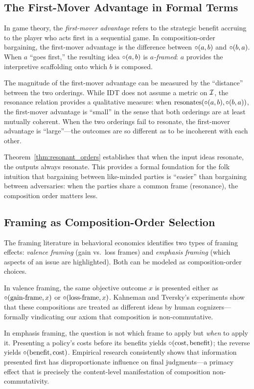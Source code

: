 \subsection{The First-Mover Advantage in Formal Terms}

In game theory, the \emph{first-mover advantage} refers to the strategic
benefit accruing to the player who acts first in a sequential game.  In
composition-order bargaining, the first-mover advantage is the difference
between $\circ(a, b)$ and $\circ(b, a)$.  When $a$ ``goes first,''
the resulting idea $\circ(a, b)$ is \emph{$a$-framed}: $a$ provides the
interpretive scaffolding onto which $b$ is composed.

The magnitude of the first-mover advantage can be measured by the
``distance'' between the two orderings.  While IDT does not assume a metric
on $\mathcal{I}$, the resonance relation provides a qualitative measure: when
$\text{resonates}(\circ(a,b), \circ(b,a))$, the first-mover advantage
is ``small'' in the sense that both orderings are at least mutually
coherent.  When the two orderings fail to resonate, the first-mover
advantage is ``large''---the outcomes are so different as to be
incoherent with each other.

Theorem~\ref{thm:resonant_orders} establishes that when the input ideas
resonate, the outputs always resonate.  This provides a formal foundation
for the folk intuition that bargaining between like-minded parties is
``easier'' than bargaining between adversaries: when the parties share a
common frame (resonance), the composition order matters less.

\subsection{Framing as Composition-Order Selection}

The framing literature in behavioral economics identifies two types of
framing effects: \emph{valence framing} (gain vs.\ loss frames) and
\emph{emphasis framing} (which aspects of an issue are highlighted).  Both
can be modeled as composition-order choices.

In valence framing, the same objective outcome $x$ is presented either as
$\circ(\text{gain-frame}, x)$ or $\circ(\text{loss-frame}, x)$.
Kahneman and Tversky's experiments show that these compositions are treated
as different ideas by human cognizers---formally vindicating our axiom that
composition is non-commutative.

In emphasis framing, the question is not which frame to apply but
\emph{when} to apply it.  Presenting a policy's costs before its benefits
yields $\circ(\text{cost}, \text{benefit})$; the reverse yields
$\circ(\text{benefit}, \text{cost})$.  Empirical research consistently
shows that information presented first has disproportionate influence on
final judgments---a primacy effect that is precisely the content-level
manifestation of composition non-commutativity.

